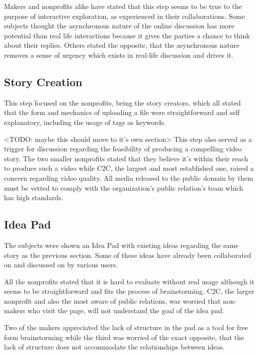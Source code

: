Makers and nonprofits alike have stated that this step seems to be true to the purpose of interactive exploration, as experienced in their collaborations. Some subjects thought the asynchronous nature of the online discussion has more potential than real life interactions because it gives the parties a chance to think about their replies. Others stated the opposite, that the asynchronous nature removes a sense of urgency which exists in real-life discussion and drives it. 

\subsection{Story Creation}

This step focused on the nonprofits, being the story creators, which all stated that the form and mechanics of uploading a file were straightforward and self explanatory, including the usage of tags as keywords. 

<TODO: maybe this should move to it's own section>
This step also served as a trigger for discussion regarding the feasibility of producing a compelling video story. The two smaller nonprofits stated that they believe it's within their reach to produce such a video while C2C, the largest and most established one, raised a concern regarding video quality. All media released to the public domain by them must be vetted to comply with the organization's public relation's team which has high standards.   

\subsection{Idea Pad}

The subjects were shown an Idea Pad with existing ideas regarding the same story as the previous section. Some of these ideas have already been collaborated on and discussed on by various users.

All the nonprofits stated that it is hard to evaluate without real usage although it seems to be straightforward and fits the process of brainstorming. C2C, the larger nonprofit and also the most aware of public relations, was worried that non-makers who visit the page, will not understand the goal of the idea pad.   

Two of the makers appreciated the lack of structure in the pad as a tool for free form brainstorming while the third was worried of the exact opposite, that the lack of structure does not accommodate the relationships between ideas.

